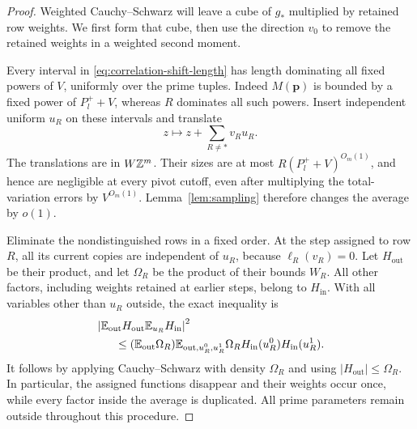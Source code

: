 \begin{proof}
Weighted Cauchy--Schwarz will leave a cube of $g_*$ multiplied by
retained row weights.  We first form that cube, then use the direction
$v_0$ to remove the retained weights in a weighted second moment.

Every interval in \eqref{eq:correlation-shift-length} has length
dominating all fixed powers of $V$, uniformly over the prime tuples.
Indeed $M(\boldsymbol p)$ is bounded by a fixed power of $P_l^++V$,
whereas $R$ dominates all such powers.  Insert independent uniform
$u_R$ on these intervals and translate
\[
 z\longmapsto z+\sum_{R\ne *}v_Ru_R.
\]
The translations are in $W\mathbb Z^m$.  Their sizes are at most
$R(P_l^++V)^{O_m(1)}$, and hence are negligible at every pivot cutoff,
even after multiplying the total-variation errors by $V^{O_m(1)}$.
Lemma~\ref{lem:sampling} therefore changes the average by $o(1)$.

Eliminate the nondistinguished rows in a fixed order.  At the step
assigned to row $R$, all its current copies are independent of $u_R$,
because $\ell_R(v_R)=0$.  Let $H_{\mathrm{out}}$ be their product,
and let $\Omega_R$ be the product of their bounds $W_R$.
All other factors, including weights retained at earlier steps, belong
to $H_{\mathrm{in}}$.  With all variables other than $u_R$ outside,
the exact inequality is
\begin{align}
 &\left|\mathbb E_{\mathrm{out}}H_{\mathrm{out}}
                   \mathbb E_{u_R}H_{\mathrm{in}}\right|^2\notag\\
 &\hspace{6mm}\le
   (\mathbb E_{\mathrm{out}}\Omega_R)
   \mathbb E_{\mathrm{out},u_R^0,u_R^1}
       \Omega_R H_{\mathrm{in}}(u_R^0)H_{\mathrm{in}}(u_R^1).
 \label{eq:additive-weighted-cs}
\end{align}
It follows by applying Cauchy--Schwarz with density $\Omega_R$ and
using $|H_{\mathrm{out}}|\le\Omega_R$.  In particular, the assigned
functions disappear and their weights occur once, while every factor
inside the average is duplicated.  All prime parameters remain
outside throughout this procedure.


\end{proof}
